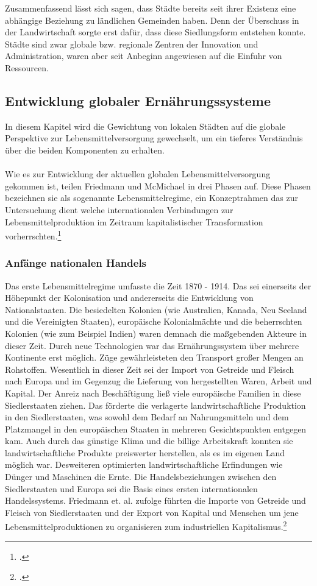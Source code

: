\documentclass{scrartcl}
\begin{document}
Zusammenfassend lässt sich sagen, dass Städte bereits seit ihrer Existenz eine abhängige Beziehung zu ländlichen Gemeinden haben. Denn der Überschuss in der Landwirtschaft sorgte erst dafür, dass diese Siedlungsform entstehen konnte. Städte sind zwar globale bzw. regionale Zentren der Innovation und Administration, waren aber seit Anbeginn angewiesen auf die Einfuhr von Ressourcen. 

\subsection{Entwicklung globaler Ernährungssysteme}
In diesem Kapitel wird die Gewichtung von lokalen Städten auf die globale Perspektive zur Lebensmittelversorgung gewechselt, um ein tieferes Verständnis über die beiden Komponenten zu erhalten.
\\
\\
Wie es zur Entwicklung der aktuellen globalen Lebensmittelversorgung gekommen ist, teilen Friedmann und McMichael in drei Phasen auf. Diese Phasen bezeichnen sie als sogenannte Lebensmittelregime, ein Konzeptrahmen das zur Untersuchung dient welche internationalen Verbindungen zur Lebensmittelproduktion im Zeitraum kapitalistischer Transformation vorherrschten.\footcite[Vgl.][S.95]{Friedmann1989AGRICULTUREPresent}

\subsubsection*{Anfänge nationalen Handels}
Das erste Lebensmittelregime umfasste die Zeit 1870 - 1914. Das sei einerseits der Höhepunkt der Kolonisation und andererseits die Entwicklung von Nationalstaaten. Die besiedelten Kolonien (wie Australien, Kanada, Neu Seeland und die Vereinigten Staaten), europäische Kolonialmächte und die beherrschten Kolonien (wie zum Beispiel Indien) waren demnach die maßgebenden Akteure in dieser Zeit. Durch neue Technologien war das Ernährungssystem über mehrere Kontinente erst möglich. Züge gewährleisteten den Transport großer Mengen an Rohstoffen. Wesentlich in dieser Zeit sei der Import von Getreide und Fleisch nach Europa und im Gegenzug die Lieferung von hergestellten Waren, Arbeit und Kapital. Der Anreiz nach Beschäftigung ließ viele europäische Familien in diese Siedlerstaaten ziehen. Das förderte die verlagerte landwirtschaftliche Produktion in den Siedlerstaaten, was sowohl dem Bedarf an Nahrungsmitteln und dem Platzmangel in den europäischen Staaten in mehreren Gesichtspunkten entgegen kam. Auch durch das günstige Klima und die billige Arbeitskraft konnten sie landwirtschaftliche Produkte preiswerter herstellen, als es im eigenen Land möglich war. Desweiteren optimierten landwirtschaftliche Erfindungen wie Dünger und Maschinen die Ernte. Die Handelsbeziehungen zwischen den Siedlerstaaten und Europa sei die Basis eines ersten internationalen Handelssystems. Friedmann et. al. zufolge führten die Importe von Getreide und Fleisch von Siedlerstaaten und der Export von Kapital und Menschen um jene Lebensmittelproduktionen zu organisieren zum industriellen Kapitalismus.\footcite[Vgl.][S.96ff]{Friedmann1989AGRICULTUREPresent}
\end{document}
